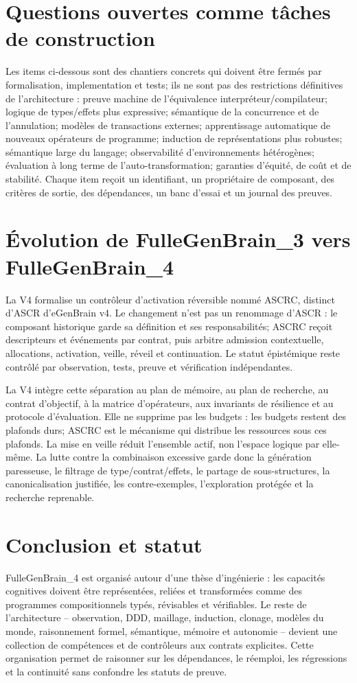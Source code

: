 \documentclass[11pt,a4paper]{article}
\begin{document}
\section{Questions ouvertes comme tâches de construction}
Les items ci-dessous sont des chantiers concrets qui doivent être fermés par formalisation, implementation et tests; ils ne sont pas des restrictions définitives de l'architecture : preuve machine de l'équivalence interpréteur/compilateur; logique de types/effets plus expressive; sémantique de la concurrence et de l'annulation; modèles de transactions externes; apprentissage automatique de nouveaux opérateurs de programme; induction de représentations plus robustes; sémantique large du langage; observabilité d'environnements hétérogènes; évaluation à long terme de l'auto-transformation; garanties d'équité, de coût et de stabilité. Chaque item reçoit un identifiant, un propriétaire de composant, des critères de sortie, des dépendances, un banc d'essai et un journal des preuves.

\section{Évolution de FulleGenBrain\_3 vers FulleGenBrain\_4}
La V4 formalise un contrôleur d'activation réversible nommé ASCRC, distinct d'ASCR d'eGenBrain v4. Le changement n'est pas un renommage d'ASCR : le composant historique garde sa définition et ses responsabilités; ASCRC reçoit descripteurs et événements par contrat, puis arbitre admission contextuelle, allocations, activation, veille, réveil et continuation. Le statut épistémique reste contrôlé par observation, tests, preuve et vérification indépendantes.

La V4 intègre cette séparation au plan de mémoire, au plan de recherche, au contrat d'objectif, à la matrice d'opérateurs, aux invariants de résilience et au protocole d'évaluation. Elle ne supprime pas les budgets : les budgets restent des plafonds durs; ASCRC est le mécanisme qui distribue les ressources sous ces plafonds. La mise en veille réduit l'ensemble actif, non l'espace logique par elle-même. La lutte contre la combinaison excessive garde donc la génération paresseuse, le filtrage de type/contrat/effets, le partage de sous-structures, la canonicalisation justifiée, les contre-exemples, l'exploration protégée et la recherche reprenable.

\section{Conclusion et statut}
FulleGenBrain\_4 est organisé autour d'une thèse d'ingénierie : les capacités cognitives doivent être représentées, reliées et transformées comme des programmes compositionnels typés, révisables et vérifiables. Le reste de l'architecture -- observation, DDD, maillage, induction, clonage, modèles du monde, raisonnement formel, sémantique, mémoire et autonomie -- devient une collection de compétences et de contrôleurs aux contrats explicites. Cette organisation permet de raisonner sur les dépendances, le réemploi, les régressions et la continuité sans confondre les statuts de preuve.
\end{document}
